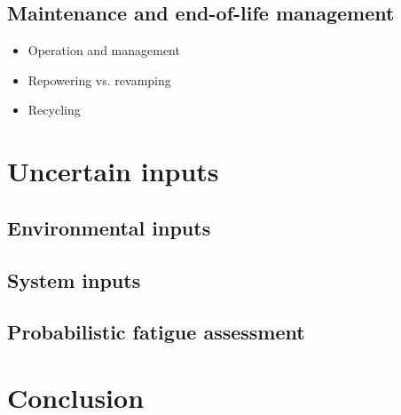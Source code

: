 \subsection{Maintenance and end-of-life management}
\begin{itemize}
    \item Operation and management
    \item Repowering vs. revamping
    \item Recycling 
\end{itemize}


\section{Uncertain inputs} \label{sec:owt_uncertainties}


\subsection{Environmental inputs}


\subsection{System inputs}


\subsection{Probabilistic fatigue assessment}




\section{Conclusion}
